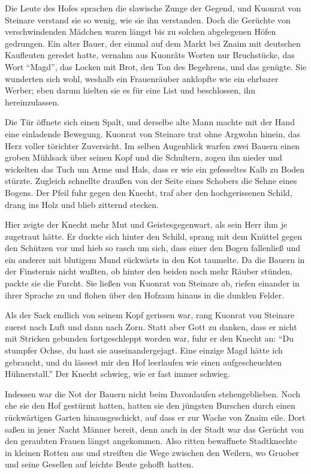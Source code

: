 Die Leute des Hofes sprachen die slawische Zunge der Gegend, und \gls{Kuonrat von Steinare} verstand sie so wenig, wie sie ihn verstanden. Doch die Gerüchte von verschwindenden Mädchen waren längst bis zu solchen abgelegenen Höfen gedrungen. Ein alter Bauer, der einmal auf dem Markt bei \gls{Znaim} mit deutschen Kaufleuten geredet hatte, vernahm aus Kuonr\^{a}ts Worten nur Bruchstücke, das Wort \enquote{Magd}, das Locken mit Brot, den Ton des Begehrens, und das genügte. Sie wunderten sich wohl, weshalb ein Frauenräuber anklopfte wie ein ehrbarer Werber; eben darum hielten sie es für eine List und beschlossen, ihn hereinzulassen.

Die Tür öffnete sich einen Spalt, und derselbe alte Mann machte mit der Hand eine einladende Bewegung. \gls{Kuonrat von Steinare} trat ohne Argwohn hinein, das Herz voller törichter Zuversicht. Im selben Augenblick warfen zwei Bauern einen groben Mühlsack über seinen Kopf und die Schultern, zogen ihn nieder und wickelten das Tuch um Arme und Hals, dass er wie ein gefesseltes Kalb zu Boden stürzte. Zugleich schnellte draußen von der Seite eines Schobers die Sehne eines Bogens. Der Pfeil fuhr gegen den \gls{Knecht}, traf aber den hochgerissenen Schild, drang ins Holz und blieb zitternd stecken.

Hier zeigte der \gls{Knecht} mehr Mut und Geistesgegenwart, als sein Herr ihm je zugetraut hätte. Er duckte sich hinter den Schild, sprang mit dem Knüttel gegen den Schützen vor und hieb so rasch um sich, dass einer den Bogen fallenließ und ein anderer mit blutigem Mund rückwärts in den Kot taumelte. Da die Bauern in der Finsternis nicht wußten, ob hinter den beiden noch mehr Räuber stünden, packte sie die Furcht. Sie ließen von \gls{Kuonrat von Steinare} ab, riefen einander in ihrer Sprache zu und flohen über den Hofzaun hinaus in die dunklen Felder.

Als der Sack endlich von seinem Kopf gerissen war, rang \gls{Kuonrat von Steinare} zuerst nach Luft und dann nach Zorn. Statt aber Gott zu danken, dass er nicht mit Stricken gebunden fortgeschleppt worden war, fuhr er den \gls{Knecht} an: \enquote{Du stumpfer Ochse, du hast sie auseinandergejagt. Eine einzige Magd hätte ich gebraucht, und du lässest mir den Hof leerlaufen wie einen aufgescheuchten Hühnerstall.} Der \gls{Knecht} schwieg, wie er fast immer schwieg.

Indessen war die Not der Bauern nicht beim Davonlaufen stehengeblieben. Noch ehe sie den Hof gestürmt hatten, hatten sie den jüngsten Burschen durch einen rückwärtigen Garten hinausgeschickt, auf dass er zur Wache von \gls{Znaim} eile. Dort saßen in jener Nacht Männer bereit, denn auch in der Stadt war das Gerücht von den geraubten Frauen längst angekommen. Also ritten bewaffnete Stadtknechte in kleinen Rotten aus und streiften die Wege zwischen den Weilern, wo \gls{Gruober} und seine Gesellen auf leichte Beute gehofft hatten.

